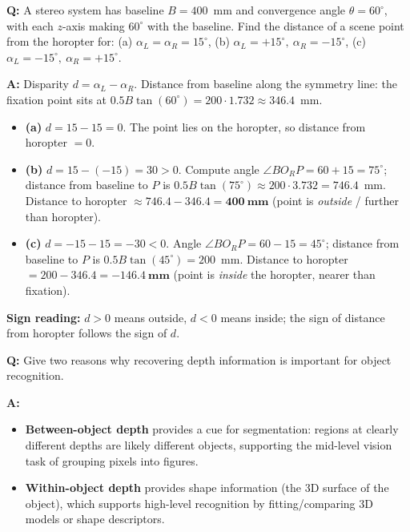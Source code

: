 \begin{exbox}
\textbf{Q:} A stereo system has baseline $B = 400$~mm and convergence angle $\theta = 60^\circ$, with each $z$-axis making $60^\circ$ with the baseline. Find the distance of a scene point from the horopter for:
(a) $\alpha_L = \alpha_R = 15^\circ$, (b) $\alpha_L = +15^\circ,\ \alpha_R = -15^\circ$, (c) $\alpha_L = -15^\circ,\ \alpha_R = +15^\circ$.

\textbf{A:} Disparity $d = \alpha_L - \alpha_R$. Distance from baseline along the symmetry line: the fixation point sits at $0.5 B \tan(60^\circ) = 200 \cdot 1.732 \approx 346.4$~mm.

\begin{itemize}
  \item \textbf{(a)} $d = 15 - 15 = 0$. The point lies on the horopter, so distance from horopter $= 0$.
  \item \textbf{(b)} $d = 15 - (-15) = 30 > 0$. Compute angle $\angle B O_R P = 60 + 15 = 75^\circ$; distance from baseline to $P$ is $0.5 B \tan(75^\circ) \approx 200 \cdot 3.732 = 746.4$~mm. Distance to horopter $\approx 746.4 - 346.4 = \mathbf{400~\text{mm}}$ (point is \emph{outside} / further than horopter).
  \item \textbf{(c)} $d = -15 - 15 = -30 < 0$. Angle $\angle B O_R P = 60 - 15 = 45^\circ$; distance from baseline to $P$ is $0.5 B \tan(45^\circ) = 200$~mm. Distance to horopter $= 200 - 346.4 = \mathbf{-146.4~\text{mm}}$ (point is \emph{inside} the horopter, nearer than fixation).
\end{itemize}
\textbf{Sign reading:} $d > 0$ means outside, $d < 0$ means inside; the sign of distance from horopter follows the sign of $d$.
\end{exbox}

\begin{exbox}
\textbf{Q:} Give two reasons why recovering depth information is important for object recognition.

\textbf{A:}
\begin{itemize}
  \item \textbf{Between-object depth} provides a cue for segmentation: regions at clearly different depths are likely different objects, supporting the mid-level vision task of grouping pixels into figures.
  \item \textbf{Within-object depth} provides shape information (the 3D surface of the object), which supports high-level recognition by fitting/comparing 3D models or shape descriptors.
\end{itemize}
\end{exbox}

